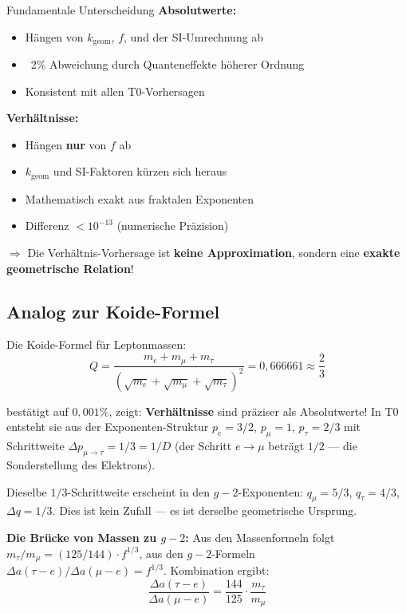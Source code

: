 	\begin{important}{Fundamentale Unterscheidung}
		\textbf{Absolutwerte:}
		\begin{itemize}
			\item Hängen von $k_{\text{geom}}$, $f$, und der SI-Umrechnung ab
			\item ~2\% Abweichung durch Quanteneffekte höherer Ordnung
			\item Konsistent mit allen T0-Vorhersagen
		\end{itemize}
		
		\textbf{Verhältnisse:}
		\begin{itemize}
			\item Hängen \textbf{nur} von $f$ ab
			\item $k_{\text{geom}}$ und SI-Faktoren kürzen sich heraus
			\item Mathematisch exakt aus fraktalen Exponenten
			\item Differenz $< 10^{-13}$ (numerische Präzision)
		\end{itemize}
		
		$\Rightarrow$ Die Verhältnis-Vorhersage ist \textbf{keine Approximation}, sondern eine \textbf{exakte geometrische Relation}!
	\end{important}
	
	\subsection{Analog zur Koide-Formel}
	
	Die Koide-Formel für Leptonmassen:
	\begin{equation}
		Q = \frac{m_e + m_\mu + m_\tau}{(\sqrt{m_e} + \sqrt{m_\mu} + \sqrt{m_\tau})^2} = 0{,}666661 \approx \frac{2}{3}
	\end{equation}
	
	bestätigt auf $0{,}001\%$, zeigt: \textbf{Verhältnisse} sind präziser als Absolutwerte! In T0 entsteht sie aus der Exponenten-Struktur $p_e = 3/2$, $p_\mu = 1$, $p_\tau = 2/3$ mit Schrittweite $\Delta p_{\mu\to\tau} = 1/3 = 1/D$ (der Schritt $e\to\mu$ beträgt $1/2$ — die Sonderstellung des Elektrons).
	
	Dieselbe $1/3$-Schrittweite erscheint in den $g-2$-Exponenten: $q_\mu = 5/3$, $q_\tau = 4/3$, $\Delta q = 1/3$. Dies ist kein Zufall — es ist derselbe geometrische Ursprung.
	
	\textbf{Die Brücke von Massen zu $g-2$:} Aus den Massenformeln folgt $m_\tau/m_\mu = (125/144) \cdot f^{1/3}$, aus den $g-2$-Formeln $\Delta a(\tau{-}e)/\Delta a(\mu{-}e) = f^{1/3}$. Kombination ergibt:
	\begin{equation}
		\boxed{\frac{\Delta a(\tau{-}e)}{\Delta a(\mu{-}e)} = \frac{144}{125} \cdot \frac{m_\tau}{m_\mu}}
		\label{eq:bridge}
	\end{equation}
	
